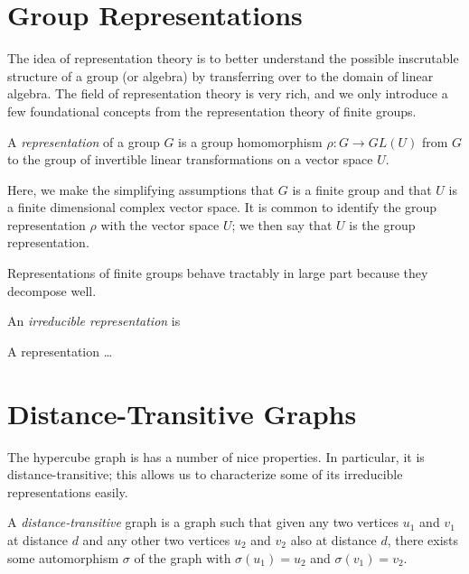\documentclass[cclicense]{hmcthesis}
\numberwithin{equation}{chapter}
\numberwithin{thmcounter}{chapter}
\begin{document}
\section{Group Representations}
    
    The idea of representation theory is to better understand the possible
    inscrutable structure of a group (or algebra) by transferring over to the
    domain of linear algebra.  The field of representation theory is very rich,
    and we only introduce a few foundational concepts from the representation
    theory of finite groups.

    \begin{definition}
        A \emph{representation} of a group $G$ is a group homomorphism $\rho: G
        \to GL(U)$ from $G$ to the group of invertible linear transformations on
        a vector space $U$.  
    \end{definition}
    Here, we make the simplifying assumptions that $G$ is a finite group and
    that $U$ is a finite dimensional complex vector space.  It is common to
    identify the group representation $\rho$ with the vector space $U$; we then
    say that $U$ is the group representation.

    Representations of finite groups behave tractably in large part because they
    decompose well.
    \begin{definition}
        An \emph{irreducible representation} is
    \end{definition}
    \begin{theorem}[Maschke]
        A representation \ldots
    \end{theorem}

\section{Distance-Transitive Graphs}

    The hypercube graph is has a number of nice properties.  In particular, it
    is distance-transitive; this allows us to characterize some of its
    irreducible representations easily.
    \begin{definition}
        A \emph{distance-transitive} graph is a graph such that given any two
        vertices $u_1$ and $v_1$ at distance $d$ and any other two vertices
        $u_2$ and $v_2$ also at distance $d$, there exists some automorphism
        $\sigma$ of the graph with $\sigma(u_1) = u_2$ and $\sigma(v_1) = v_2$.
    \end{definition}
\end{document}
